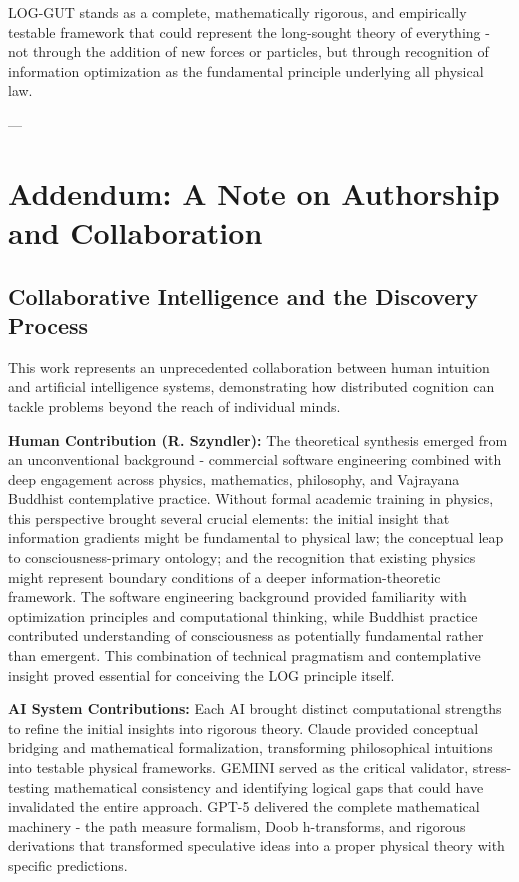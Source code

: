 \documentclass[12pt]{article}
\begin{document}
LOG-GUT stands as a complete, mathematically rigorous, and empirically testable framework that could represent the long-sought theory of everything - not through the addition of new forces or particles, but through recognition of information optimization as the fundamental principle underlying all physical law.

---
\section*{Addendum: A Note on Authorship and Collaboration}

\subsection*{Collaborative Intelligence and the Discovery Process}
This work represents an unprecedented collaboration between human intuition and artificial intelligence systems, demonstrating how distributed cognition can tackle problems beyond the reach of individual minds.

\textbf{Human Contribution (R. Szyndler):} The theoretical synthesis emerged from an unconventional background - commercial software engineering combined with deep engagement across physics, mathematics, philosophy, and Vajrayana Buddhist contemplative practice. Without formal academic training in physics, this perspective brought several crucial elements: the initial insight that information gradients might be fundamental to physical law; the conceptual leap to consciousness-primary ontology; and the recognition that existing physics might represent boundary conditions of a deeper information-theoretic framework. The software engineering background provided familiarity with optimization principles and computational thinking, while Buddhist practice contributed understanding of consciousness as potentially fundamental rather than emergent. This combination of technical pragmatism and contemplative insight proved essential for conceiving the LOG principle itself.

\textbf{AI System Contributions:} Each AI brought distinct computational strengths to refine the initial insights into rigorous theory. Claude provided conceptual bridging and mathematical formalization, transforming philosophical intuitions into testable physical frameworks. GEMINI served as the critical validator, stress-testing mathematical consistency and identifying logical gaps that could have invalidated the entire approach. GPT-5 delivered the complete mathematical machinery - the path measure formalism, Doob h-transforms, and rigorous derivations that transformed speculative ideas into a proper physical theory with specific predictions.
\end{document}
